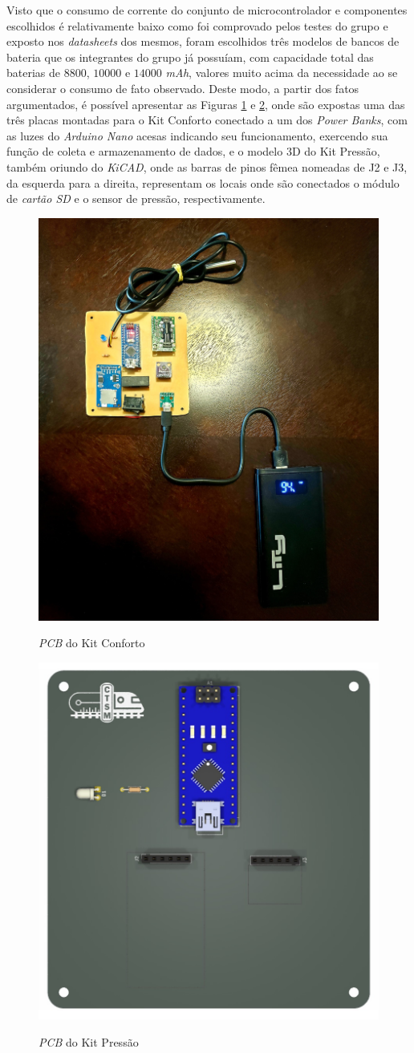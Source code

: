 \documentclass[acronym,symbols,table]{fei}
\begin{document}
Visto que o consumo de corrente do conjunto de microcontrolador e componentes escolhidos é relativamente baixo como foi comprovado pelos testes do grupo e exposto nos \textit{datasheets} dos mesmos, foram escolhidos três modelos de bancos de bateria que os integrantes do grupo já possuíam, com capacidade total das baterias de $8800$, $10000$ e $14000$ \textit{mAh}, valores muito acima da necessidade ao se considerar o consumo de fato observado. Deste modo, a partir dos fatos argumentados, é possível apresentar as Figuras \ref{fig:PCB_conforto} e \ref{fig:PCB_Pressao}, onde são expostas uma das três placas montadas para o Kit Conforto conectado a um dos \textit{Power Banks}, com as luzes do \textit{Arduino Nano} acesas indicando seu funcionamento, exercendo sua função de coleta e armazenamento de dados, e o modelo 3D do Kit Pressão, também oriundo do \textit{KiCAD}, onde as barras de pinos fêmea nomeadas de J2 e J3, da esquerda para a direita, representam os locais onde são conectados o módulo de \textit{cartão SD} e o sensor de pressão, respectivamente.

\begin{figure}[!htb]
\centering
    \caption{\textit{PCB} do Kit Conforto}
    \includegraphics[width=0.60\linewidth]{Imagens/PCB_Conforto.jpeg}
    \label{fig:PCB_conforto}
\end{figure}

\begin{figure}[!htb]
\centering
    \caption{\textit{PCB} do Kit Pressão}
    \includegraphics[width=0.50\linewidth]{Imagens/PCB_Pressao.jpg}
    \label{fig:PCB_Pressao}
\end{figure}
\end{document}
